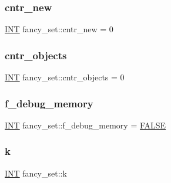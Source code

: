 \subsubsection{\texorpdfstring{cntr\+\_\+new}{cntr\_new}}
{\footnotesize\ttfamily \mbox{\hyperlink{galois_8h_a09fddde158a3a20bd2dcadb609de11dc}{I\+NT}} fancy\+\_\+set\+::cntr\+\_\+new = 0\hspace{0.3cm}{\ttfamily [static]}}

\mbox{\label{classfancy__set_a5ef2964e300c5cb3780541ec58750073}} 
\subsubsection{\texorpdfstring{cntr\+\_\+objects}{cntr\_objects}}
{\footnotesize\ttfamily \mbox{\hyperlink{galois_8h_a09fddde158a3a20bd2dcadb609de11dc}{I\+NT}} fancy\+\_\+set\+::cntr\+\_\+objects = 0\hspace{0.3cm}{\ttfamily [static]}}

\mbox{\label{classfancy__set_a018eb365a4f57d22f88e759bea678030}} 
\subsubsection{\texorpdfstring{f\+\_\+debug\+\_\+memory}{f\_debug\_memory}}
{\footnotesize\ttfamily \mbox{\hyperlink{galois_8h_a09fddde158a3a20bd2dcadb609de11dc}{I\+NT}} fancy\+\_\+set\+::f\+\_\+debug\+\_\+memory = \mbox{\hyperlink{nauty_8h_aa93f0eb578d23995850d61f7d61c55c1}{F\+A\+L\+SE}}\hspace{0.3cm}{\ttfamily [static]}}

\mbox{\label{classfancy__set_a24542fbd3ff9860949ef8a33ca889c40}} 
\subsubsection{\texorpdfstring{k}{k}}
{\footnotesize\ttfamily \mbox{\hyperlink{galois_8h_a09fddde158a3a20bd2dcadb609de11dc}{I\+NT}} fancy\+\_\+set\+::k}


